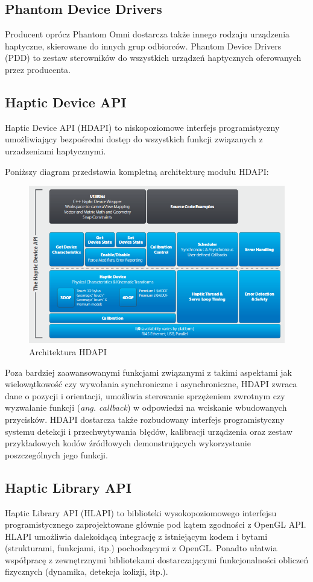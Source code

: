 \documentclass[licencjacka]{pracamgr}
\begin{document}
\subsection{Phantom Device Drivers}
Producent oprócz Phantom Omni dostarcza także innego rodzaju urządzenia haptyczne, skierowane do innych grup odbiorców. Phantom Device Drivers (PDD) to zestaw sterowników do wszystkich urządzeń haptycznych oferowanych przez producenta. 

\subsection{Haptic Device API}
Haptic Device API (HDAPI) to niskopoziomowe interfejs programistyczny umożliwiający bezpośredni dostęp do wszystkich funkcji związanych z urzadzeniami haptycznymi.

Poniższy diagram przedstawia kompletną architekturę modułu HDAPI:

\begin{figure}[H]
\centering
\includegraphics[scale=0.65,center]{hdapi}
\caption{Architektura HDAPI}
\end{figure}

Poza bardziej zaawansowanymi funkcjami związanymi z takimi aspektami jak wielowątkowość czy wywołania synchroniczne i asynchroniczne, HDAPI zwraca dane o pozycji i orientacji, umożliwia sterowanie sprzężeniem zwrotnym czy wyzwalanie funkcji (\textit{ang. callback}) w odpowiedzi na wciskanie wbudowanych przycisków. HDAPI dostarcza także rozbudowany interfejs programistyczny systemu detekcji i przechwytywania błędów, kalibracji urządzenia oraz zestaw przykładowych kodów źródłowych demonstrujących wykorzystanie poszczególnych jego funkcji.

\subsection{Haptic Library API}
Haptic Library API (HLAPI) to biblioteki wysokopoziomowego interfejsu programistycznego zaprojektowane głównie pod kątem zgodności z OpenGL API. HLAPI umożliwia dalekoidącą integrację z istniejącym kodem i bytami (strukturami, funkcjami, itp.) pochodzącymi z OpenGL. Ponadto ułatwia współpracę z zewnętrznymi bibliotekami dostarczającymi funkcjonalności obliczeń fizycznych (dynamika, detekcja kolizji, itp.).
\end{document}

